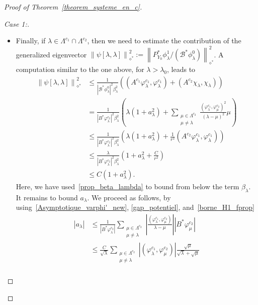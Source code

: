\documentclass[10pt]{amsart}
\theoremstyle{definition}\newtheorem{defi}[theo]{Definition}\newtheorem{rema}[theo]{Remark}\newtheorem{exam}[theo]{Example}\newtheorem{exem}[theo]{Example}\newtheorem{nota}[theo]{Notation}
\newenvironment{step}[1]{\begin{proof}[#1]}{\let\qed\relax\end{proof}}
\newcommand{\fprop}[2]{\varphi^{#1}_{#2}}
\newcommand\Bs{\mathcal{B}^*}
\newcommand{\Fzp}{Y_0}
\newcommand{\normeXalphas}[1]{\left\| #1 \right\|_{\diamond^*}}
\newcommand{\PFa}{P_{\Fzp}^*}
\begin{document}
\begin{proof}[Proof of Theorem~\ref{theorem_systeme_en_c}]
\begin{step}{Case 1:}
\begin{itemize}
Using Parseval's identity, \eqref{borne_H1_fprop} and then~\eqref{ABM_xi_lambda}, we finally obtain
\begin{align*}
\normeXalphas{\psi[\lambda]}^2 & \leq \frac{1}{|B^* \xi_\lambda|^2} \left(\lambda + \frac{1}{r^2} (\fprop{c_1}{\lambda}, A^{c_2}\fprop{c_1}{\lambda}) \right) \\
& \leq \frac{\lambda}{|B^* \xi_\lambda|^2} \left(1 + \frac{C}{r^2}\right)\\
& \leq C.
\end{align*}

\item Finally, if $\lambda\in \Lambda^{c_1}\cap \Lambda^{c_2}$, then we need to estimate the contribution of the generalized eigenvector $\normeXalphas{\psi[\lambda,\lambda]}^2:=\normeXalphas{\PFa \phi_\lambda^1/(\Bs \phi_\lambda^0)}^2$. A computation similar to the one above, for $\lambda > \lambda_0$, leads to
\begin{align*}
\normeXalphas{\psi[\lambda,\lambda]}^2& \leq \frac{1}{|\Bs \phi_\lambda^0|^2 \beta_\lambda^2} \left((A^{c_1} \fprop{c_1}{\lambda},\fprop{c_1}{\lambda}) + (A^{c_2} \chi_\lambda,\chi_\lambda) \right) \\
& = \frac{1}{|B^* \fprop{c_2}{\lambda}|^2 \beta_\lambda^2} \left(\lambda (1+a_\lambda^2) + \sum_{\substack{\mu \in \Lambda^{c_2}\\ \mu\neq \lambda}} \frac{(\fprop{c_1}{\lambda},\fprop{c_2}{\mu})^2}{(\lambda-\mu)^2} \mu \right)\\
& \leq \frac{1}{|B^* \fprop{c_2}{\lambda}|^2 \beta_\lambda^2} \left(\lambda (1+a_\lambda^2) + \frac{1}{r^2} (A^{c_2}\fprop{c_1}{\lambda},\fprop{c_1}{\lambda}) \right)\\
& \leq \frac{\lambda}{|B^* \fprop{c_2}{\lambda}|^2 \beta_\lambda^2} \left(1+a_\lambda^2 + \frac{C}{r^2} \right)\\
& \leq C (1+a_\lambda^2).
\end{align*}
Here, we have used~\eqref{prop_beta_lambda} to bound from below the term $\beta_\lambda$. It remains to bound $a_\lambda$. We proceed as follows, by using~\eqref{Asymptotique_varphi'_new}, \eqref{gap_potentiel}, and~\eqref{borne_H1_fprop}
\begin{align*}
|a_\lambda| & \leq \frac{1}{|B^* \fprop{c_2}{\lambda}|} \sum_{\substack{\mu\in \Lambda^{c_2}\\ \mu \neq \lambda}} \left| \frac{(\fprop{c_1}{\lambda},\fprop{c_2}{\mu})}{\lambda-\mu}\right| |B^* \fprop{c_2}{\mu}| \\
& \leq \frac{C}{\sqrt{\lambda}} \sum_{\substack{\mu\in \Lambda^{c_2}\\ \mu \neq \lambda}} |(\fprop{c_1}{\lambda},\fprop{c_2}{\mu})| \frac{\sqrt{\mu}}{\sqrt{\lambda}+\sqrt{\mu}} \\

\end{align*}
\end{itemize}
\end{step}
\end{proof}
\end{document}
